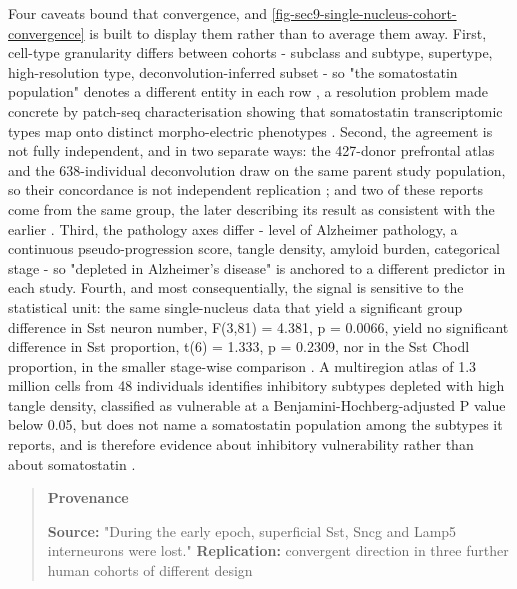 \documentclass[11pt]{article}
\begin{document}
Four caveats bound that convergence, and \ref{fig-sec9-single-nucleus-cohort-convergence} is built to display them rather than to average them away. First, cell-type granularity differs between cohorts - subclass and subtype, supertype, high-resolution type, deconvolution-inferred subset - so "the somatostatin population" denotes a different entity in each row \citep{Mathys2023,Gabitto2024,Cain2023,Mathys2024}, a resolution problem made concrete by patch-seq characterisation showing that somatostatin transcriptomic types map onto distinct morpho-electric phenotypes \citep{Lee2023b}. Second, the agreement is not fully independent, and in two separate ways: the 427-donor prefrontal atlas and the 638-individual deconvolution draw on the same parent study population, so their concordance is not independent replication \citep{Mathys2023,Cain2023}; and two of these reports come from the same group, the later describing its result as consistent with the earlier \citep{Mathys2023,Mathys2024}. Third, the pathology axes differ - level of Alzheimer pathology, a continuous pseudo-progression score, tangle density, amyloid burden, categorical stage - so "depleted in Alzheimer's disease" is anchored to a different predictor in each study. Fourth, and most consequentially, the signal is sensitive to the statistical unit: the same single-nucleus data that yield a significant group difference in Sst neuron number, F(3,81) = 4.381, p = 0.0066, yield no significant difference in Sst proportion, t(6) = 1.333, p = 0.2309, nor in the Sst Chodl proportion, in the smaller stage-wise comparison \citep{Joshi2024}. A multiregion atlas of 1.3 million cells from 48 individuals identifies inhibitory subtypes depleted with high tangle density, classified as vulnerable at a Benjamini-Hochberg-adjusted P value below 0.05, but does not name a somatostatin population among the subtypes it reports, and is therefore evidence about inhibitory vulnerability rather than about somatostatin \citep{Mathys2024}.

\begin{quote}
\noindent\textbf{Provenance}\par
\textbf{Source:} "During the early epoch, superficial Sst, Sncg and Lamp5 interneurons were lost." \citep{Gabitto2024} \textbf{Replication:} convergent direction in three further human cohorts of different design \citep{Mathys2023,Cain2023,Travaglini2026}

\end{quote}
\end{document}
